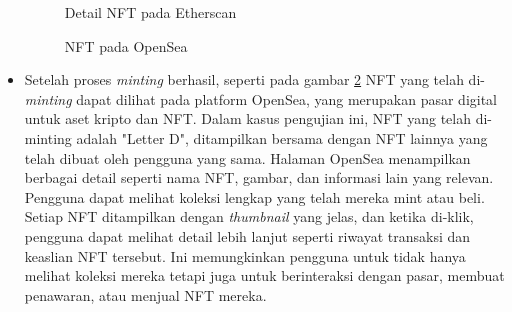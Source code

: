 \begin{itemize}
    \begin{figure} [H] \centering
    \caption{Detail NFT pada Etherscan}
    \label{fig:detail_nft_etherscan}
    \end{figure}
    
    \begin{figure} [H] \centering
    \caption{NFT pada OpenSea}
    \label{fig:nft_opensea}
    \end{figure}

    \item Setelah proses \emph{minting} berhasil, seperti pada gambar \ref*{fig:nft_opensea} NFT yang telah di-\emph{minting} dapat dilihat pada platform OpenSea, yang merupakan pasar digital untuk aset kripto dan NFT. Dalam kasus pengujian ini, NFT yang telah di-minting adalah "Letter D", ditampilkan bersama dengan NFT lainnya yang telah dibuat oleh pengguna yang sama. Halaman OpenSea menampilkan berbagai detail seperti nama NFT, gambar, dan informasi lain yang relevan. Pengguna dapat melihat koleksi lengkap yang telah mereka mint atau beli. Setiap NFT ditampilkan dengan \emph{thumbnail} yang jelas, dan ketika di-klik, pengguna dapat melihat detail lebih lanjut seperti riwayat transaksi dan keaslian NFT tersebut. Ini memungkinkan pengguna untuk tidak hanya melihat koleksi mereka tetapi juga untuk berinteraksi dengan pasar, membuat penawaran, atau menjual NFT mereka.



\end{itemize}
